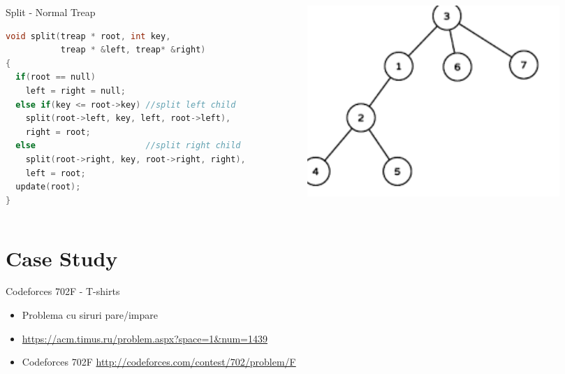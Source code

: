 \documentclass[10pt]{beamer}
\begin{document}
\begin{frame}[fragile]
\begin{columns}
	\begin{column}{0.60\linewidth}	
		\begin{block}{Split - Normal Treap}
			\begin{lstlisting}[language=c++]
void split(treap * root, int key, 
           treap * &left, treap* &right)
{
  if(root == null)
    left = right = null;
  else if(key <= root->key) //split left child
  	split(root->left, key, left, root->left),
  	right = root;
  else                      //split right child
    split(root->right, key, root->right, right),
    left = root;
  update(root);
}
			\end{lstlisting}
		\end{block}
	\end{column}	
	\begin{column}{0.38\linewidth}	
	\begin{figure}[htb]
          \centering
          \includegraphics[width=1\linewidth]{images/graph.png}
        \end{figure}
	\end{column}	
	\end{columns}	
\end{frame}


\section{Case Study}


\begin{frame}{Codeforces 702F - T-shirts}

\begin{itemize}
	\item Problema cu siruri pare/impare
	\item \url{https://acm.timus.ru/problem.aspx?space=1&num=1439}
	\item Codeforces 702F \url{http://codeforces.com/contest/702/problem/F}	
\end{itemize}



\end{frame}
\end{document}
